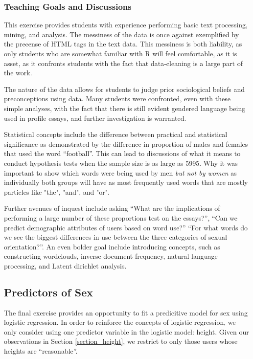 \documentclass{article}\usepackage[]{graphicx}\usepackage[]{color}
\begin{document}
\subsubsection{Teaching Goals and Discussions}
This exercise provides students with experience performing basic text processing, mining, and analysis.  The messiness of the data is once against exemplified by the precense of HTML tags in the text data.  This messiness is both liability, as only students who are somewhat familiar with R will feel comfortable, as it is asset, as it confronts students with the fact that data-cleaning is a large part of the work.

The nature of the data allows for students to judge prior sociological beliefs and preconceptions using data.  Many students were confronted, even with these simple analyses, with the fact that there is still evident gendered language being used in profile essays, and further investigation is warranted.  

Statistical concepts include the difference between practical and statistical significance as demonstrated by the difference in proportion of males and females that used the word ``football''.  This can lead to discussions of what it means to conduct hypothesis tests when the sample size is as large as 5995.  Why it was important to show which words were being used by men \textit{but not by women} as individually both groups will have as most frequently used words that are mostly particles like "the", "and", and "or".  

Further avenues of inquest include asking ``What are the implications of performing a large number of these proportions test on the essays?'', ``Can we predict demographic attributes of users based on word use?''  ``For what words do we see the biggest differences in use between the three categories of sexual orientation?''.  An even bolder goal include introducing concepts, such as constructing wordclouds,  inverse document frequency, natural language processing, and Latent dirichlet analysis\cite{LDA:2003}.







\subsection{Predictors of Sex}
The final exercise provides an opportunity to fit a predicitive model for sex using logistic regression.  In order to reinforce the concepts of logistic regression, we only consider using one predictor variable in the logistic model: height.  Given our observations in Section \ref{section_height}, we restrict to only those users whose heights are ``reasonable''.
\end{document}
